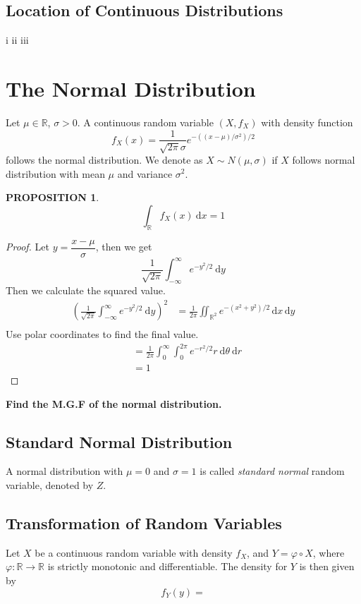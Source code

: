 \documentclass[11pt,a4paper]{article}
\newcommand{\dd}{\mathrm{d}}
\newcommand{\dx}{\dd x}
\newcommand{\dy}{\dd y}
\newtheorem*{proposition}{PROPOSITION}
\begin{document}
\subsection{Location of Continuous Distributions}
i
ii
iii

\section{The Normal Distribution}
Let $\mu\in\mathbb{R}$, $\sigma>0$. A continuous random variable $(X,f_X)$ with density function
\[f_X(x) = \frac{1}{\sqrt{2\pi}\sigma}e^{-((x-\mu)/\sigma^2)/2}\]
follows the normal distribution.
We denote as $X\sim N(\mu,\sigma)$ if $X$ follows normal distribution with mean
$\mu$ and variance $\sigma^2$.
\newline

\begin{proposition}
    $$\int_{\mathbb{R}}f_X(x)\ \dx=1$$
\end{proposition}
\begin{proof}
    Let $y=\dfrac{x-\mu}{\sigma}$, then we get
    \[\frac{1}{\sqrt{2\pi}}\int_{-\infty}^{\infty}e^{-y^2/2}\ \dy\]
    Then we calculate the squared value.
    \begin{align*}
        \left(\frac{1}{\sqrt{2\pi}}\int_{-\infty}^{\infty}e^{-y^2/2}\ \dy\right)^2 & =
        \frac{1}{2\pi}\iint_{\mathbb{R}^2}e^{-(x^2+y^2)/2}\,\dx\,\dy                   \\
    \end{align*}
    Use polar coordinates to find the final value.
    \begin{align*}
         & =\frac{1}{2\pi}\int_{0}^{\infty}\int_{0}^{2\pi}e^{-r^2/2}r\ \dd\theta\ \dd r \\
         & = 1
    \end{align*}
\end{proof}
{\bf Find the M.G.F of the normal distribution.}


\subsection{Standard Normal Distribution}
A normal distribution with $\mu=0$ and $\sigma=1$ is called {\it standard normal}
random variable, denoted by $Z$.

\subsection{Transformation of Random Variables}
Let $X$ be a continuous random variable with density $f_X$, and $Y=\varphi\circ X$,
where $\varphi:\mathbb{R}\rightarrow\mathbb{R}$ is strictly monotonic and differentiable.
The density for $Y$ is then given by
\[f_Y(y)=\]
\end{document}
